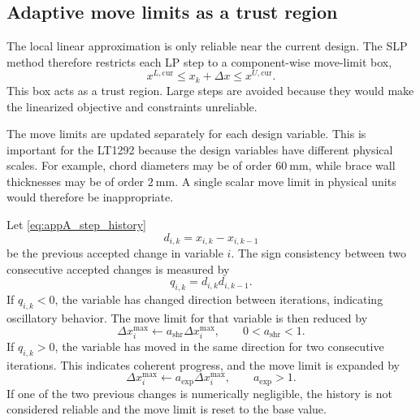 \documentclass[11pt,a4paper]{article}
\begin{document}
\subsection{Adaptive move limits as a trust region}
\label{sec:slpA:movelim}

The local linear approximation is only reliable near the current
design. The SLP method therefore restricts each LP step to a
component-wise move-limit box,
\begin{equation}
\label{eq:appA_move_box}
    x^{L,\mathrm{cur}}
    \leq
    x_k + \Delta x
    \leq
    x^{U,\mathrm{cur}} .
\end{equation}
This box acts as a trust region. Large steps are avoided because they
would make the linearized objective and constraints unreliable.

The move limits are updated separately for each design variable. This
is important for the LT1292 because the design variables have
different physical scales. For example, chord diameters may be of
order $60~\mathrm{mm}$, while brace wall thicknesses may be of order
$2~\mathrm{mm}$. A single scalar move limit in physical units would
therefore be inappropriate.

Let \autoref{eq:appA_step_history}
\begin{equation}
\label{eq:appA_step_history}
    d_{i,k}
    =
    x_{i,k} - x_{i,k-1}
\end{equation}
be the previous accepted change in variable $i$. The sign consistency
between two consecutive accepted changes is measured by
\begin{equation}
\label{eq:appA_sign_product}
    q_{i,k}
    =
    d_{i,k}d_{i,k-1}.
\end{equation}
If $q_{i,k}<0$, the variable has changed direction between
iterations, indicating oscillatory behavior. The move limit for that
variable is then reduced by
\begin{equation}
\label{eq:appA_move_shrink}
    \Delta x_i^{\max}
    \leftarrow
    a_{\mathrm{shr}}\Delta x_i^{\max},
    \qquad
    0<a_{\mathrm{shr}}<1 .
\end{equation}
If $q_{i,k}>0$, the variable has moved in the same direction for two
consecutive iterations. This indicates coherent progress, and the
move limit is expanded by
\begin{equation}
\label{eq:appA_move_expand}
    \Delta x_i^{\max}
    \leftarrow
    a_{\mathrm{exp}}\Delta x_i^{\max},
    \qquad
    a_{\mathrm{exp}}>1 .
\end{equation}
If one of the two previous changes is numerically negligible, the
history is not considered reliable and the move limit is reset to the
base value.
\end{document}
